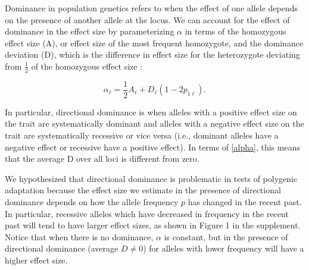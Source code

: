 \documentclass[a4paper,12pt]{article}
\begin{document}

Dominance in population genetics refers to when the effect of one
allele depends on the presence of another allele at the locus. We can account for
the effect of dominance in the effect size by parameterizing $\alpha$
in terms of the homozygous effect size (A), or effect size of the most frequent homozygote, and the
dominance deviation (D), which is the difference in effect size for the heterozygote
deviating from $\frac{1}{2}$ of the homozygous effect size \cite{gillespie}:

\begin{equation}  
  \alpha_\ell = \frac{1}{2} A_\ell + D_\ell\left(1-2p_{1\ell}\right).
  \label{alpha}
\end{equation}

In particular, directional dominance is when alleles with a positive effect
size on the trait are systematically dominant and alleles with a
negative effect size on the trait are systematically recessive or vice
versa (i.e., dominant alleles have a negative effect or recessive have
a positive effect). In terms of \eqref{alpha}, this means that the
average D over all loci is different from zero. 

We hypothesized that directional dominance is problematic in tests of polygenic adaptation
because the effect size we estimate in the presence of directional
dominance depends on how the allele frequency $p$ has changed in the
recent past. In particular, recessive alleles which have decreased in frequency
in the recent past will tend to have larger effect sizes, as shown in
Figure 1 in the supplement. Notice that when there is no dominance,
$\alpha$ is constant, but in the presence of directional dominance
(average $D\neq0$) for alleles with lower frequency will have a higher
effect size. 
\end{document}
